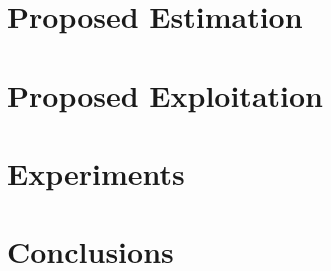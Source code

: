\documentclass[sigconf, nonacm]{acmart}
\begin{document}
\section{Proposed \nef Estimation}
\label{sec:neest}


\section{Proposed \nef Exploitation}
\label{sec:neexp}


\section{Experiments}
\label{sec:exp}


\section{Conclusions}
\label{sec:concl}


\newpage
\balance




\newpage
\appendixpageoff
\appendixtitleoff
\renewcommand{\appendixtocname}{Supplementary Material}
\begin{appendices}
\label{sec:app}

\end{appendices}


% 
\end{document}
